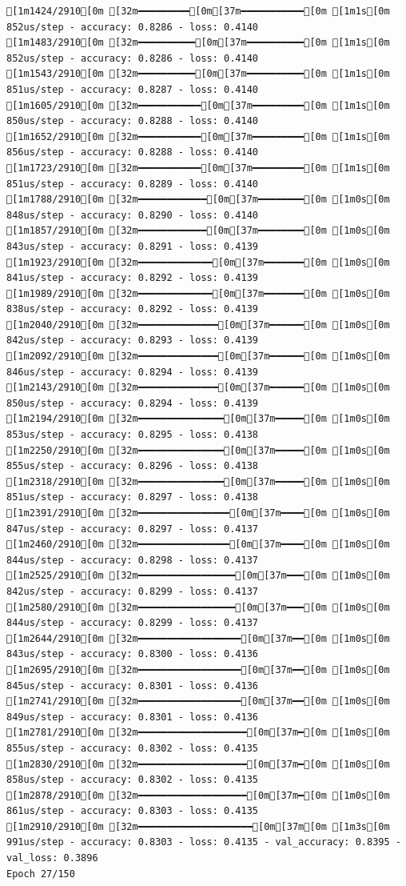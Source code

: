\documentclass[
  letterpaper,
  DIV=11,
  numbers=noendperiod]{scrartcl}
\begin{document}
\begin{verbatim}
[1m1424/2910[0m [32m━━━━━━━━━[0m[37m━━━━━━━━━━━[0m [1m1s[0m 852us/step - accuracy: 0.8286 - loss: 0.4140
[1m1483/2910[0m [32m━━━━━━━━━━[0m[37m━━━━━━━━━━[0m [1m1s[0m 852us/step - accuracy: 0.8286 - loss: 0.4140
[1m1543/2910[0m [32m━━━━━━━━━━[0m[37m━━━━━━━━━━[0m [1m1s[0m 851us/step - accuracy: 0.8287 - loss: 0.4140
[1m1605/2910[0m [32m━━━━━━━━━━━[0m[37m━━━━━━━━━[0m [1m1s[0m 850us/step - accuracy: 0.8288 - loss: 0.4140
[1m1652/2910[0m [32m━━━━━━━━━━━[0m[37m━━━━━━━━━[0m [1m1s[0m 856us/step - accuracy: 0.8288 - loss: 0.4140
[1m1723/2910[0m [32m━━━━━━━━━━━[0m[37m━━━━━━━━━[0m [1m1s[0m 851us/step - accuracy: 0.8289 - loss: 0.4140
[1m1788/2910[0m [32m━━━━━━━━━━━━[0m[37m━━━━━━━━[0m [1m0s[0m 848us/step - accuracy: 0.8290 - loss: 0.4140
[1m1857/2910[0m [32m━━━━━━━━━━━━[0m[37m━━━━━━━━[0m [1m0s[0m 843us/step - accuracy: 0.8291 - loss: 0.4139
[1m1923/2910[0m [32m━━━━━━━━━━━━━[0m[37m━━━━━━━[0m [1m0s[0m 841us/step - accuracy: 0.8292 - loss: 0.4139
[1m1989/2910[0m [32m━━━━━━━━━━━━━[0m[37m━━━━━━━[0m [1m0s[0m 838us/step - accuracy: 0.8292 - loss: 0.4139
[1m2040/2910[0m [32m━━━━━━━━━━━━━━[0m[37m━━━━━━[0m [1m0s[0m 842us/step - accuracy: 0.8293 - loss: 0.4139
[1m2092/2910[0m [32m━━━━━━━━━━━━━━[0m[37m━━━━━━[0m [1m0s[0m 846us/step - accuracy: 0.8294 - loss: 0.4139
[1m2143/2910[0m [32m━━━━━━━━━━━━━━[0m[37m━━━━━━[0m [1m0s[0m 850us/step - accuracy: 0.8294 - loss: 0.4139
[1m2194/2910[0m [32m━━━━━━━━━━━━━━━[0m[37m━━━━━[0m [1m0s[0m 853us/step - accuracy: 0.8295 - loss: 0.4138
[1m2250/2910[0m [32m━━━━━━━━━━━━━━━[0m[37m━━━━━[0m [1m0s[0m 855us/step - accuracy: 0.8296 - loss: 0.4138
[1m2318/2910[0m [32m━━━━━━━━━━━━━━━[0m[37m━━━━━[0m [1m0s[0m 851us/step - accuracy: 0.8297 - loss: 0.4138
[1m2391/2910[0m [32m━━━━━━━━━━━━━━━━[0m[37m━━━━[0m [1m0s[0m 847us/step - accuracy: 0.8297 - loss: 0.4137
[1m2460/2910[0m [32m━━━━━━━━━━━━━━━━[0m[37m━━━━[0m [1m0s[0m 844us/step - accuracy: 0.8298 - loss: 0.4137
[1m2525/2910[0m [32m━━━━━━━━━━━━━━━━━[0m[37m━━━[0m [1m0s[0m 842us/step - accuracy: 0.8299 - loss: 0.4137
[1m2580/2910[0m [32m━━━━━━━━━━━━━━━━━[0m[37m━━━[0m [1m0s[0m 844us/step - accuracy: 0.8299 - loss: 0.4137
[1m2644/2910[0m [32m━━━━━━━━━━━━━━━━━━[0m[37m━━[0m [1m0s[0m 843us/step - accuracy: 0.8300 - loss: 0.4136
[1m2695/2910[0m [32m━━━━━━━━━━━━━━━━━━[0m[37m━━[0m [1m0s[0m 845us/step - accuracy: 0.8301 - loss: 0.4136
[1m2741/2910[0m [32m━━━━━━━━━━━━━━━━━━[0m[37m━━[0m [1m0s[0m 849us/step - accuracy: 0.8301 - loss: 0.4136
[1m2781/2910[0m [32m━━━━━━━━━━━━━━━━━━━[0m[37m━[0m [1m0s[0m 855us/step - accuracy: 0.8302 - loss: 0.4135
[1m2830/2910[0m [32m━━━━━━━━━━━━━━━━━━━[0m[37m━[0m [1m0s[0m 858us/step - accuracy: 0.8302 - loss: 0.4135
[1m2878/2910[0m [32m━━━━━━━━━━━━━━━━━━━[0m[37m━[0m [1m0s[0m 861us/step - accuracy: 0.8303 - loss: 0.4135
[1m2910/2910[0m [32m━━━━━━━━━━━━━━━━━━━━[0m[37m[0m [1m3s[0m 991us/step - accuracy: 0.8303 - loss: 0.4135 - val_accuracy: 0.8395 - val_loss: 0.3896
Epoch 27/150


\end{verbatim}
\end{document}
